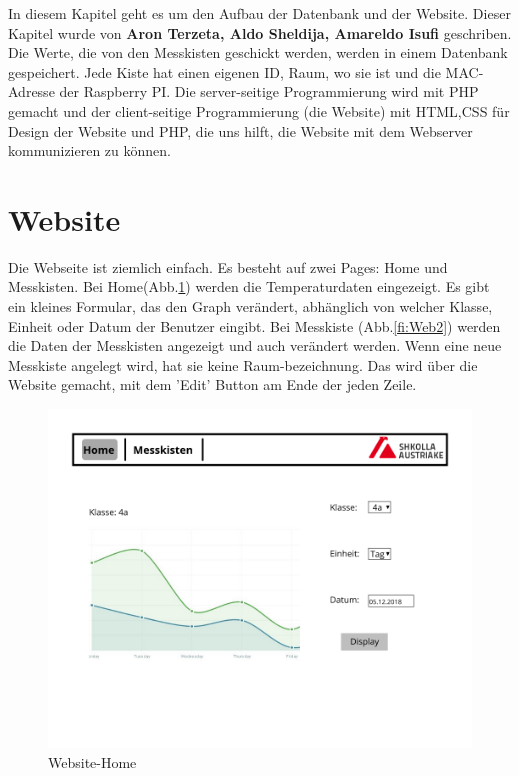 \pagestyle{fancy}
In diesem Kapitel geht es um den Aufbau der Datenbank und der Website. Dieser Kapitel wurde von \textbf{Aron Terzeta, Aldo Sheldija, Amareldo Isufi} geschriben. 
Die Werte, die von den Messkisten geschickt werden, werden in einem Datenbank gespeichert. Jede Kiste hat einen eigenen ID, Raum, wo sie ist und die MAC-Adresse der Raspberry PI. Die server-seitige Programmierung wird mit PHP gemacht und der client-seitige Programmierung (die Website) mit HTML,CSS f\"ur Design der Website und PHP, die uns hilft, die Website mit dem Webserver kommunizieren zu k\"onnen. 
	\section{Website}
	Die Webseite ist ziemlich einfach. Es besteht auf zwei Pages: Home und Messkisten. 
	Bei Home(Abb.\ref{fi:Web1}) werden die Temperaturdaten eingezeigt. Es gibt ein kleines Formular, das den Graph ver\"andert, abh\"anglich von welcher Klasse, Einheit oder Datum der Benutzer eingibt.	
	Bei Messkiste (Abb.\ref{fi:Web2}) werden die Daten der Messkisten angezeigt und auch ver\"andert werden. Wenn eine neue Messkiste angelegt wird, hat sie keine Raum-bezeichnung. Das wird \"uber die Website gemacht, mit dem 'Edit' Button am Ende der jeden Zeile. 
		\begin{figure}[ht]
		\centering
		\includegraphics[scale=0.4]{./bilder/Page_1.png}
		\caption{Website-Home}
		\label{fi:Web1}
		\end{figure} 
